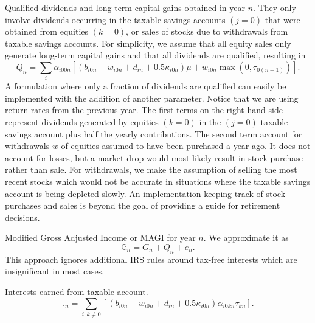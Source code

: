 \documentclass{report}[fleqn,11pt]
\begin{document}
\begin{description}[leftmargin=4em,style=multiline]
\item [$Q_n$]
	Qualified dividends and long-term capital gains obtained in year $n$.
	They only involve dividends occurring in the taxable savings accounts $(j=0)$ that
	were obtained from equities $(k=0)$, or sales of stocks due to withdrawals
	from taxable savings accounts.
	For simplicity, we assume that all equity sales only generate long-term capital gains and
	that all dividends are qualified, resulting in
	\begin{equation}
		\label{Eq:Qx2}
		Q_n = \sum_i \alpha_{i00n}\left[(b_{i0n} - w_{i0n} + d_{in} + 0.5\kappa_{i0n})\mu +
		w_{i0n}{\max(0, \tau_{0(n-1)})}\right].
	\end{equation}
	A formulation where only a fraction of dividends are qualified can easily be
	implemented with the addition of another parameter.
	Notice that we are using return rates from the previous year.
	The first terms on the right-hand side represent dividends generated by
        equities $(k=0)$ in the $(j=0)$ taxable savings account plus
	half the yearly contributions. The second term account for withdrawals $w$
        of equities assumed to have been purchased a year ago. 
	It does not account for losses, but a market drop
	would most likely result in stock purchase rather than sale.
	For withdrawals, we make the assumption of
	selling the most recent stocks which would not be accurate in situations where
	the taxable savings account is being depleted slowly. An implementation keeping track
	of stock purchases and sales is beyond the goal of providing a guide for retirement decisions.

\item [$\mathbb{G}_n$]
	Modified Gross Adjusted Income or MAGI for year $n$. We approximate it as
	\begin{equation}
		\mathbb{G}_n = G_n + Q_n + e_n.
	\end{equation}
	This approach ignores additional IRS
	rules around tax-free interests which are insignificant in most cases.

\item [$\mathbb{I}_n$]
	Interests earned from taxable account.
	\begin{equation}
		\mathbb{I}_n = \sum_{i,k\neq 0} [(b_{i0n} - w_{i0n} + d_{in}
		     + 0.5\kappa_{i0n})\alpha_{i0kn}\tau_{kn}].
	\end{equation}


\end{description}
\end{document}
